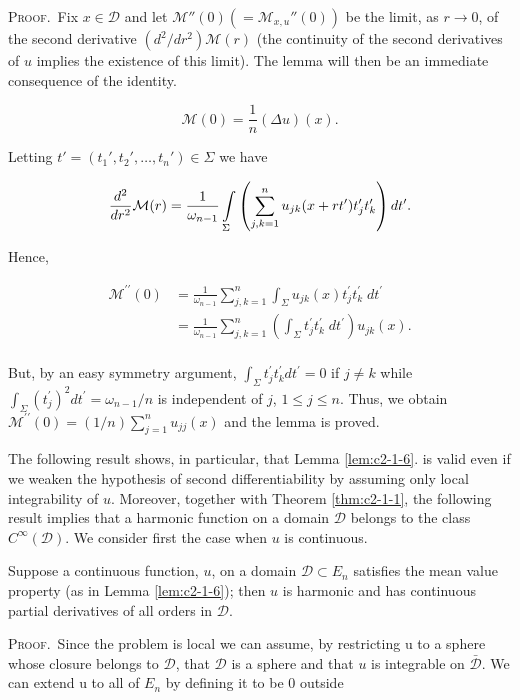 \textsc{Proof.}\ Fix $x \in \mathcal{D}$ and let $\mathcal{M}''(0) (= \mathcal{M}_{x,u}''(0))$ be the limit, as $r \to 0$, of the second derivative $(d^2/dr^2)\mathcal{M}(r)$ (the continuity of the second derivatives of $u$ implies the existence of this limit). The lemma will then be an immediate consequence of the identity.

\[
\mathcal{M}(0)=\frac{1}{n}\left(\Delta u\right)(x).
\]

Letting $t' = (t_1', t_2', \ldots, t_n') \in \Sigma$ we have

\[
\frac{d^{2}}{d r^{2}}\mathcal{M}(r)=\frac{1}{\omega_{n-1}}\intop_{\Sigma}\left(\sum_{j,k=1}^{n}u_{j k}(x+r t^{\prime})t_{j}^{\prime}t_{k}^{\prime}\right)d t^{\prime}.
\]

Hence,

\[
\begin{aligned}{\mathcal{M}^{\prime\prime}(0)}&{{}=\frac{1}{\omega_{n-1}}\sum_{j,k=1}^{n}\int_{\Sigma}u_{j k}(x)t_{j}^{\prime}t_{k}^{\prime}\;{d}t^{\prime}}\\ {}&{{}=\frac{1}{\omega_{n-1}}\sum_{j,k=1}^{n}\left(\int_{\Sigma}t_{j}^{\prime}t_{k}^{\prime}\;{d}t^{\prime}\right)u_{j k}(x).}\\ \end{aligned}
\]

But, by an easy symmetry argument, $\int_{\Sigma} t_{j}^{\prime}t_{k}^{\prime}dt^{\prime}=0$ if $j\neq k$ while $\int_{\Sigma}(t_{j}^{\prime})^{2}dt^{\prime}=\omega_{n-1}/n$ is independent of $j$, $1\leq j\leq n$. Thus, we obtain $\mathcal{M}^{\prime\prime}(0)=(1/n)\sum_{j=1}^{n}u_{jj}(x)$ and the lemma is proved.

The following result shows, in particular, that Lemma \ref{lem:c2-1-6}. is valid even if we weaken the hypothesis of second differentiability by assuming only local integrability of $u$. Moreover, together with Theorem \ref{thm:c2-1-1}, the following result implies that a harmonic function on a domain $\mathcal{D}$ belongs to the class $C^{\infty}(\mathcal{D})$. We consider first the case when $u$ is continuous.

\begin{theorem}
\label{thm:c2-1-7}
Suppose a continuous function, $u$, on a domain $\mathcal{D} \subset E_n$ satisfies the mean value property (as in Lemma \ref{lem:c2-1-6}); then $u$ is harmonic and has continuous partial derivatives of all orders in $\mathcal{D}$.
\end{theorem}

\textsc{Proof.}\ Since the problem is local we can assume, by restricting u to a sphere whose closure belongs to $\mathcal{D}$, that $\mathcal{D}$ is a sphere and that $u$ is integrable on $\bar{\mathcal{D}}$. We can extend u to all of $E_n$ by defining it to be 0 outside

